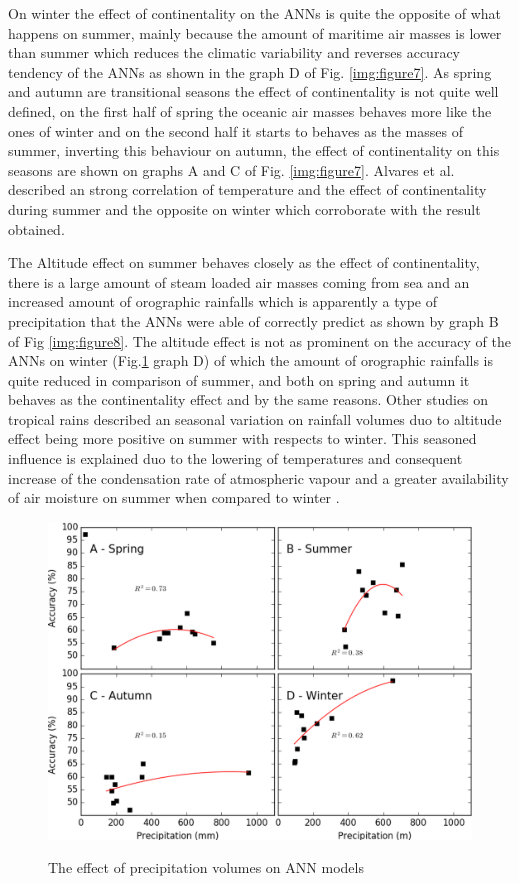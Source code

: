 On winter the effect of continentality on the ANNs is quite the opposite of what happens on summer, mainly because the amount of maritime air masses is lower than summer which reduces the climatic variability and reverses accuracy tendency of the ANNs as shown in the graph D of Fig. \ref{img:figure7}. As spring and autumn are transitional seasons the effect of continentality is not quite well defined, on the first half of spring the oceanic air masses behaves more like the ones of winter and on the second half it starts to behaves as the masses of summer, inverting this behaviour on autumn, the effect of continentality on this seasons are shown on graphs A and C of Fig. \ref{img:figure7}. Alvares et al. \cite{alvares2013modeling} described an strong correlation of temperature and the effect of continentality during summer and the opposite on winter which corroborate with the result obtained. 

The Altitude effect on summer behaves closely as the effect of continentality, there is a large amount of steam loaded air masses coming from sea and an increased amount of orographic rainfalls \cite{salati1979recycling} which is apparently a type of precipitation that the ANNs were able of correctly predict as shown by graph B of Fig \ref{img:figure8}. The altitude effect is not as prominent on the accuracy of the ANNs on winter (Fig.\ref{img:figure9} graph D) of which the amount of orographic rainfalls is quite reduced in comparison of summer, and both on spring and autumn it behaves as the continentality effect and by the same reasons. Other studies \cite{gonfiantini2001altitude} on tropical rains described an seasonal variation on rainfall volumes duo to altitude effect being more positive on summer with respects to winter. This seasoned influence is explained duo to the lowering of temperatures and consequent increase of the condensation rate of atmospheric vapour and a greater availability of air moisture on summer when compared to winter .

\begin{figure}[htb!]
 \centering
  \caption{The effect of precipitation volumes on ANN models}
 \includegraphics[scale=0.78]{capitulo_3/precipitation_accuracy}
 \label{img:figure9}
\end{figure}

